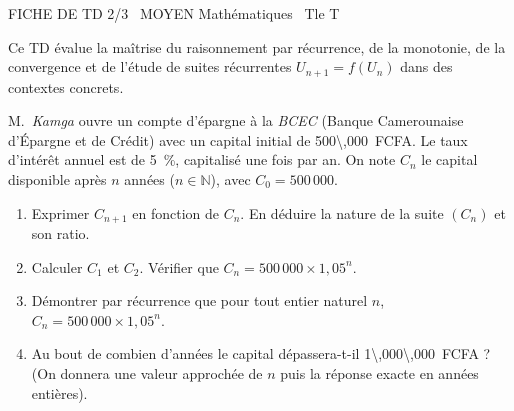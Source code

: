 \documentclass[11pt]{article}
\begin{document}
\begin{tcolorbox}[enhanced,colback=popink,colframe=popink,arc=10pt,boxrule=0pt,left=12pt,right=12pt,top=9pt,bottom=9pt]
{\color{white}\popxbold\small FICHE DE TD 2/3 \textbullet\ MOYEN \hfill Mathématiques \textbullet\ Tle T\par}
\end{tcolorbox}
\vspace{4pt}
Ce TD évalue la maîtrise du raisonnement par récurrence, de la monotonie, de la convergence et de l'étude de suites récurrentes $U_{n+1}=f(U_n)$ dans des contextes concrets.

\begin{exercice}
M.~\textit{Kamga} ouvre un compte d'épargne à la \textit{BCEC} (Banque Camerounaise d'Épargne et de Crédit) avec un capital initial de \SI{500\,000}{FCFA}. Le taux d'intérêt annuel est de \SI{5}{\%}, capitalisé une fois par an. On note $C_n$ le capital disponible après $n$ années ($n \in \mathbb{N}$), avec $C_0 = 500\,000$.
\begin{enumerate}
    \item Exprimer $C_{n+1}$ en fonction de $C_n$. En déduire la nature de la suite $(C_n)$ et son ratio.
    \item Calculer $C_1$ et $C_2$. Vérifier que $C_n = 500\,000 \times 1,05^n$.
    \item Démontrer par récurrence que pour tout entier naturel $n$, $C_n = 500\,000 \times 1,05^n$.
    \item Au bout de combien d'années le capital dépassera-t-il \SI{1\,000\,000}{FCFA} ? (On donnera une valeur approchée de $n$ puis la réponse exacte en années entières).
\end{enumerate}
\end{exercice}
\end{document}
